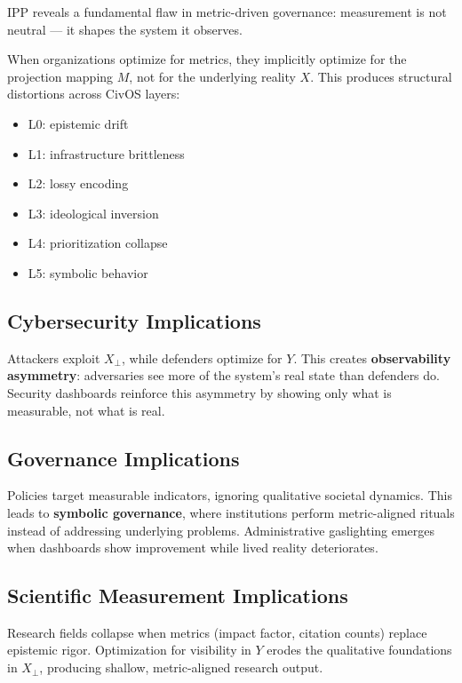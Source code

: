 \documentclass[11pt]{article}
\begin{document}
IPP reveals a fundamental flaw in metric-driven governance:
measurement is not neutral --- it shapes the system it observes.

When organizations optimize for metrics, they implicitly optimize for the projection mapping $M$, not for the underlying reality $X$.
This produces structural distortions across CivOS layers:

\begin{itemize}[leftmargin=1.5em]
    \item L0: epistemic drift
    \item L1: infrastructure brittleness
    \item L2: lossy encoding
    \item L3: ideological inversion
    \item L4: prioritization collapse
    \item L5: symbolic behavior
\end{itemize}

\subsection{Cybersecurity Implications}

Attackers exploit $X_{\perp}$, while defenders optimize for $Y$.
This creates \textbf{observability asymmetry}: adversaries see more of the system's real state than defenders do.
Security dashboards reinforce this asymmetry by showing only what is measurable, not what is real.

\subsection{Governance Implications}

Policies target measurable indicators, ignoring qualitative societal dynamics.
This leads to \textbf{symbolic governance}, where institutions perform metric-aligned rituals instead of addressing underlying problems.
Administrative gaslighting emerges when dashboards show improvement while lived reality deteriorates.

\subsection{Scientific Measurement Implications}

Research fields collapse when metrics (impact factor, citation counts) replace epistemic rigor.
Optimization for visibility in $Y$ erodes the qualitative foundations in $X_{\perp}$, producing shallow, metric-aligned research output.
\end{document}
